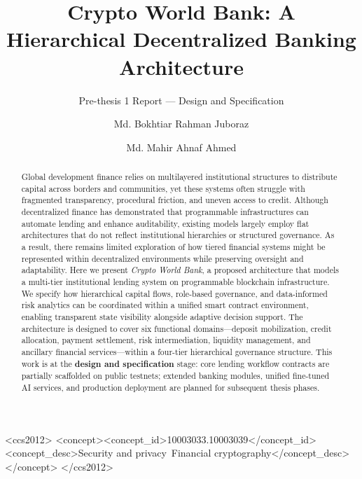 \documentclass[acmsmall,screen,review]{acmart}
\title{Crypto World Bank: A Hierarchical Decentralized Banking Architecture}
\subtitle{Pre-thesis 1 Report --- Design and Specification}
\author{Md. Bokhtiar Rahman Juboraz}
\affiliation{%
  \institution{BRAC University}%
  \department{Department of Computer Science and Engineering}%
  \city{Dhaka}%
  \country{Bangladesh}%
}
\author{Md. Mahir Ahnaf Ahmed}
\affiliation{%
  \institution{BRAC University}%
  \department{Department of Computer Science and Engineering}%
  \city{Dhaka}%
  \country{Bangladesh}%
}
\begin{document}
\begin{abstract}
Global development finance relies on multilayered institutional structures to distribute capital across borders and communities, yet these systems often struggle with fragmented transparency, procedural friction, and uneven access to credit. Although decentralized finance has demonstrated that programmable infrastructures can automate lending and enhance auditability, existing models largely employ flat architectures that do not reflect institutional hierarchies or structured governance. As a result, there remains limited exploration of how tiered financial systems might be represented within decentralized environments while preserving oversight and adaptability. Here we present \textit{Crypto World Bank}, a proposed architecture that models a multi-tier institutional lending system on programmable blockchain infrastructure. We specify how hierarchical capital flows, role-based governance, and data-informed risk analytics can be coordinated within a unified smart contract environment, enabling transparent state visibility alongside adaptive decision support. The architecture is designed to cover six functional domains---deposit mobilization, credit allocation, payment settlement, risk intermediation, liquidity management, and ancillary financial services---within a four-tier hierarchical governance structure. This work is at the \textbf{design and specification} stage: core lending workflow contracts are partially scaffolded on public testnets; extended banking modules, unified fine-tuned AI services, and production deployment are planned for subsequent thesis phases. \vspace{0.5em}
\end{abstract}

\begin{CCSXML}
<ccs2012>
<concept><concept_id>10003033.10003039</concept_id><concept_desc>Security and privacy~Financial cryptography</concept_desc></concept>
</ccs2012>
\end{CCSXML}



\maketitle


\end{document}
